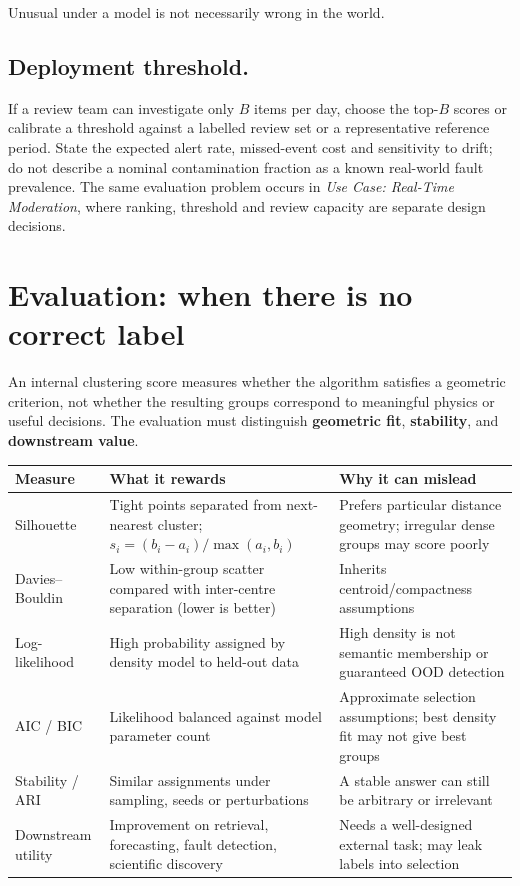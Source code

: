 \begin{calloutmemoryhook}
Unusual under a model is not necessarily wrong in the world.
\end{calloutmemoryhook}
\subsection{Deployment threshold.}
If a review team can investigate only $B$ items per day, choose the top-$B$ scores or calibrate a threshold against a labelled review set or a representative reference period.
State the expected alert rate, missed-event cost and sensitivity to drift; do not describe a nominal contamination fraction as a known real-world fault prevalence.
The same evaluation problem occurs in \emph{Use Case: Real-Time Moderation}, where ranking, threshold and review capacity are separate design decisions.

\section{Evaluation: when there is no correct label}\label{sec:evaluation}
An internal clustering score measures whether the algorithm satisfies a geometric criterion, not whether the resulting groups correspond to meaningful physics or useful decisions.
The evaluation must distinguish \textbf{geometric fit}, \textbf{stability}, and \textbf{downstream value}.
\begin{center}
\begingroup\ULtight\small
\begin{tabular}{@{}p{.20\linewidth}p{.36\linewidth}p{.35\linewidth}@{}}
\hline
\textbf{Measure} & \textbf{What it rewards} & \textbf{Why it can mislead}\\\hline
Silhouette & Tight points separated from next-nearest cluster; $s_i=(b_i-a_i)/\max(a_i,b_i)$ & Prefers particular distance geometry; irregular dense groups may score poorly\\
Davies--Bouldin & Low within-group scatter compared with inter-centre separation (lower is better) & Inherits centroid/compactness assumptions\\
Log-likelihood & High probability assigned by density model to held-out data & High density is not semantic membership or guaranteed OOD detection\\
AIC / BIC & Likelihood balanced against model parameter count & Approximate selection assumptions; best density fit may not give best groups\\
Stability / ARI & Similar assignments under sampling, seeds or perturbations & A stable answer can still be arbitrary or irrelevant\\
Downstream utility & Improvement on retrieval, forecasting, fault detection, scientific discovery & Needs a well-designed external task; may leak labels into selection\\\hline
\end{tabular}
\label{tab:metrics}
\endgroup
\end{center}

